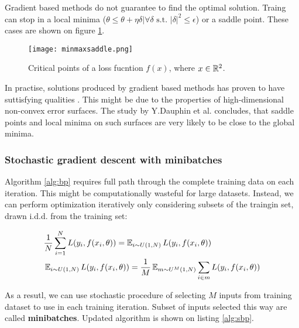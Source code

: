

Gradient based methods do not guarantee to find the optimal solution.
Traing can stop in a local minima ($\theta \leq \theta + \eta \delta | \forall \delta \text{ s.t. } |\delta|^2 \leq \epsilon$) or a saddle point.
These cases are shown on figure \ref{fig:critical}.

\begin{figure}[h!]
  \centering
    \texttt{[image: minmaxsaddle.png]}
  \caption{Critical points of a loss fucntion $f(x)$, where $x \in \Bbb{R}^2$.}
  \label{fig:critical}
\end{figure}

In practise, solutions produced by gradient based methods has proven to have suttisfying qualities \cite{Szegedy2016,He2015}.
This might be due to the properties of high-dimensional non-convex error surfaces. The study by Y.Dauphin et al. \cite{Dauphin14} concludes, that saddle points and local minima on such surfaces are very likely to be close to the global minima.

\subsubsection{Stochastic gradient descent with minibatches}

Algorithm \ref{alg:bp} requires full path through the complete training data on each iteration.
This might be computationally wasteful for large datasets. Instead, we can perform optimization iteratively only considering subsets of the traingin set, drawn i.d.d. from the training set:

\begin{equation*}\label{eq:sopt}
  \begin{aligned}
  & \frac{1}{N} \sum_{i=1}^{N} L(y_i, f(x_i, \theta)) = \operatorname{\mathbb{E}}_{i \sim U(1,N) } L(y_i, f(x_i, \theta)) \\
  & \operatorname{\mathbb{E}}_{i \sim U(1,N) } L(y_i, f(x_i, \theta))= \frac{1}{M} \operatorname{\mathbb{E}}_{m \sim U^M(1,N) } \sum_{i \in m} L(y_i, f(x_i, \theta))
  \end{aligned}
\end{equation*}

As a resutl, we can use stochastic procedure of selecting $M$ inputs from training dataset to use in each training iteration.
Subset of inputs selected this way are called \textbf{minibatches}. Updated algorithm is shown on listing \ref{alg:sbp}.




